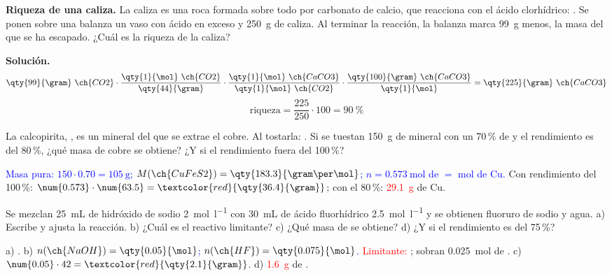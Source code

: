 \begin{example}
    \textbf{Riqueza de una caliza.} La caliza es una roca formada sobre todo por carbonato de calcio, que reacciona con el ácido
    clorhídrico: . Se ponen sobre una balanza un vaso con ácido en
    exceso y \qty{250}{\gram} de caliza. Al terminar la reacción, la balanza marca \qty{99}{\gram} menos, la masa del  que
    se ha escapado. ¿Cuál es la riqueza de la caliza?

    \textbf{Solución.}
    \[ \qty{99}{\gram}\ \ch{CO2} \cdot \frac{\qty{1}{\mol}\ \ch{CO2}}{\qty{44}{\gram}} \cdot \frac{\qty{1}{\mol}\ \ch{CaCO3}}{\qty{1}{\mol}\ \ch{CO2}}
    \cdot \frac{\qty{100}{\gram}\ \ch{CaCO3}}{\qty{1}{\mol}} = \qty{225}{\gram}\ \ch{CaCO3} \]
    \[ \text{riqueza} = \frac{225}{250} \cdot 100 = \qty{90}{\percent} \]
\end{example}

\begin{exercise}
    La calcopirita, , es un mineral del que se extrae el cobre. Al tostarla: . Si se tuestan \qty{150}{\gram} de mineral con un 70\,\% de  y el rendimiento es del 80\,\%, ¿qué masa de
    cobre se obtiene? ¿Y si el rendimiento fuera del 100\,\%?
    \begin{solu}
        \textcolor{blue}{Masa pura: \(150 \cdot \num{0.70} = \qty{105}{\gram}\); \(M(\ch{CuFeS2}) = \qty{183.3}{\gram\per\mol}\);
        \(n = \qty{0.573}{\mol}\) de  \(=\) mol de Cu.} Con rendimiento del 100\,\%: \(\num{0.573} \cdot \num{63.5} =
        \textcolor{red}{\qty{36.4}{\gram}}\); con el 80\,\%: \textcolor{red}{\qty{29.1}{\gram}} de Cu.
    \end{solu}
\end{exercise}

\begin{exercise}
    Se mezclan \qty{25}{\mL} de hidróxido de sodio \qty{2}{\mol\per\litre} con \qty{30}{\mL} de ácido fluorhídrico
    \qty{2.5}{\mol\per\litre} y se obtienen fluoruro de sodio y agua. a) Escribe y ajusta la reacción. b) ¿Cuál es el reactivo
    limitante? c) ¿Qué masa de  se obtiene? d) ¿Y si el rendimiento es del 75\,\%?
    \begin{solu}
        a) \textcolor{red}{}. b) \textcolor{blue}{\(n(\ch{NaOH}) = \qty{0.05}{\mol}\);
        \(n(\ch{HF}) = \qty{0.075}{\mol}\).} \textcolor{red}{Limitante: }; sobran \qty{0.025}{\mol} de .
        c) \(\num{0.05} \cdot 42 = \textcolor{red}{\qty{2.1}{\gram}}\). d) \textcolor{red}{\qty{1.6}{\gram}} de .
    \end{solu}
\end{exercise}

